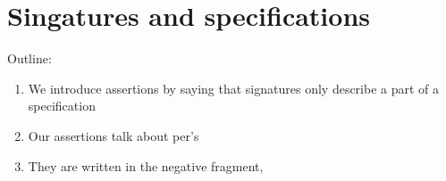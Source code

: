 \section{Singatures and specifications}
\label{sec:sing-spec}

Outline:
%
\begin{enumerate}
\item We introduce assertions by saying that signatures only describe a
  part of a specification
\item Our assertions talk about per's
\item They are written in the negative fragment,
\end{enumerate}




